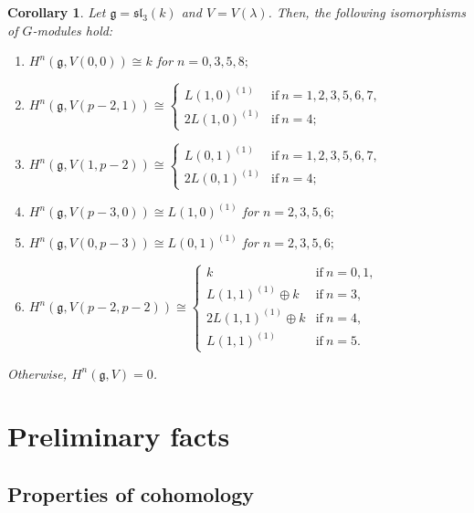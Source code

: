 \documentclass[pdftex]{sigma}%
\numberwithin{equation}{section}
\newtheorem{Corollary}[Theorem]{Corollary}
\begin{document}
\begin{Corollary}\label{c3} Let $\mathfrak{g}=\mathfrak{sl}_3(k)$ and $V=V(\lambda)$. Then, the following isomorphisms of $G$-modules hold:

\begin{enumerate}\itemsep=0pt

\item[$(a)$] $H^n(\mathfrak{g},V(0,0))\cong k$ for $n=0,3,5,8;$

\item[$(b)$] $H^n(\mathfrak{g},V(p-2,1))\cong
\begin{cases}
L(1,0)^{(1)}&\text{if}\ n=1,2,3,5,6,7,
\\
2L(1,0)^{(1)}&\text{if}\ n=4;
\end{cases}$

\item[$(c)$] $H^n(\mathfrak{g},V(1,p-2))\cong
\begin{cases}
L(0,1)^{(1)}&\text{if}\ n=1,2,3,5,6,7,\\
2L(0,1)^{(1)}&\text{if}\ n=4;
\end{cases}$

\item[$(d)$] $H^n(\mathfrak{g},V(p-3,0))\cong L(1,0)^{(1)}$ for $n=2,3,5,6;$

\item[$(e)$] $H^n(\mathfrak{g},V(0,p-3))\cong L(0,1)^{(1)}$ for $n=2,3,5,6;$

\item[$(f)$] $H^n(\mathfrak{g},V(p-2,p-2))\cong
\begin{cases}
k&\text{if}\ n=0,1,\\
L(1,1)^{(1)}\oplus k&\text{if}\ n=3,\\
2L(1,1)^{(1)}\oplus k&\text{if}\ n=4,\\
L(1,1)^{(1)}&\text{if}\ n=5.
\end{cases}$
\end{enumerate}
Otherwise, $H^n(\mathfrak{g},V)=0$.
\end{Corollary}

\section{Preliminary facts}%

\subsection{Properties of cohomology}%
\end{document}
